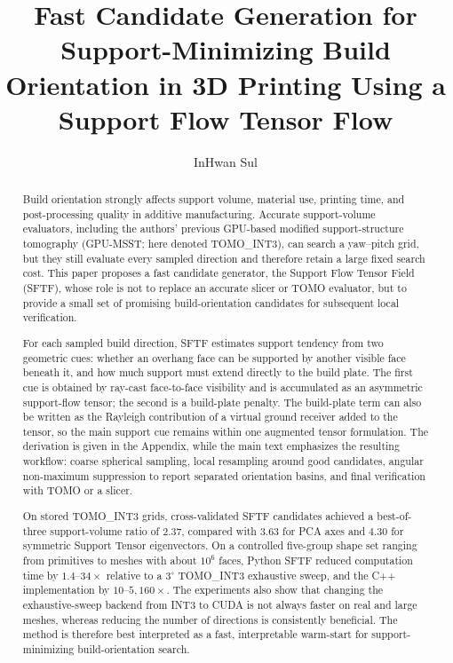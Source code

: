 \documentclass[11pt,a4paper]{article}
\title{Fast Candidate Generation for Support-Minimizing Build Orientation in 3D Printing Using a Support Flow Tensor Flow}
\author{InHwan Sul}
\date{}
\begin{document}
\maketitle

\begin{abstract}
Build orientation strongly affects support volume, material use, printing time, and post-processing quality in additive manufacturing.
Accurate support-volume evaluators, including the authors' previous GPU-based modified support-structure tomography (GPU-MSST; here denoted TOMO\_INT3),
can search a yaw--pitch grid, but they still evaluate every sampled direction and therefore retain a large fixed search cost.
This paper proposes a fast candidate generator, the Support Flow Tensor Field (SFTF), whose role is not to replace an accurate slicer or TOMO evaluator,
but to provide a small set of promising build-orientation candidates for subsequent local verification.

For each sampled build direction, SFTF estimates support tendency from two geometric cues: whether an overhang face can be supported by another visible face beneath it, and how much support must extend directly to the build plate.
The first cue is obtained by ray-cast face-to-face visibility and is accumulated as an asymmetric support-flow tensor; the second is a build-plate penalty.
The build-plate term can also be written as the Rayleigh contribution of a virtual ground receiver added to the tensor, so the main support cue remains within one augmented tensor formulation.
The derivation is given in the Appendix, while the main text emphasizes the resulting workflow: coarse spherical sampling, local resampling around good candidates, angular non-maximum suppression to report separated orientation basins, and final verification with TOMO or a slicer.

On stored TOMO\_INT3 grids, cross-validated SFTF candidates achieved a best-of-three support-volume ratio of $2.37$, compared with $3.63$ for PCA axes and $4.30$ for symmetric Support Tensor eigenvectors.
On a controlled five-group shape set ranging from primitives to meshes with about $10^6$ faces, Python SFTF reduced computation time by $1.4$--$34\times$ relative to a $3^\circ$ TOMO\_INT3 exhaustive sweep, and the C++ implementation by $10$--$5{,}160\times$.
The experiments also show that changing the exhaustive-sweep backend from INT3 to CUDA is not always faster on real and large meshes, whereas reducing the number of directions is consistently beneficial.
The method is therefore best interpreted as a fast, interpretable warm-start for support-minimizing build-orientation search.
\end{abstract}
\end{document}
